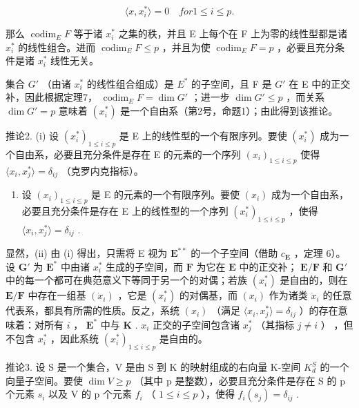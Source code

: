 \[
\langle x, x _ {i} ^ {*} \rangle = 0 \quad for 1 \leqslant i \leqslant p.
\]

那么 \(\operatorname{codim}_{E} F\) 等于诸 \(x_{i}^{*}\) 之集的秩，并且 E 上每个在 F 上为零的线性型都是诸 \(x_{i}^{*}\) 的线性组合。进而 \(\operatorname{codim}_{E} F \leqslant p\) ，并且为使 \(\operatorname{codim}_{E} F = p\) ，必要且充分条件是诸 \(x_{i}^{*}\) 线性无关。

集合 \(G'\) （由诸 \(x_{i}^{*}\) 的线性组合组成）是 \(E^{*}\) 的子空间，且 F 是 \(G'\) 在 E 中的正交补，因此根据定理7， \(\operatorname{codim}_{E} F = \dim G'\) ；进一步 \(\dim G' \leqslant p\) ，而关系 \(\dim G' = p\) 意味着 \((x_{i}^{*})\) 是一个自由系（第2号，命题1）；由此得到该推论。

推论2. (i) 设 \((x_{i}^{*})_{1\leqslant i\leqslant p}\) 是 E 上的线性型的一个有限序列。要使 \((x_{i}^{*})\) 成为一个自由系，必要且充分条件是存在 E 的元素的一个序列 \((x_{i})_{1\leqslant i\leqslant p}\) 使得 \(\langle x_i,x_j^*\rangle = \delta_{ij}\) （克罗内克指标）。

\begin{enumerate}
\def\labelenumi{(\roman{enumi})}
\setcounter{enumi}{1}
\tightlist
\item
  设 \((x_{i})_{1\leqslant i\leqslant p}\) 是 E 的元素的一个有限序列。要使 \((x_{i})\) 成为一个自由系，必要且充分条件是存在 E 上的线性型的一个序列 \((x_{i}^{*})_{1\leqslant i\leqslant p}\) ，使得 \(\langle x_i,x_j^*\rangle = \delta_{ij}\) .
\end{enumerate}

显然，(ii) 由 (i) 得出，只需将 E 视为 \(\mathbf{E}^{**}\) 的一个子空间（借助 \(c_{\mathbf{E}}\) ，定理 6）。设 \(\mathbf{G}'\) 为 \(\mathbf{E}^*\) 中由诸 \(x_{i}^{*}\) 生成的子空间，而 \(\mathbf{F}\) 为它在 \(\mathbf{E}\) 中的正交补； \(\mathbf{E} / \mathbf{F}\) 和 \(\mathbf{G}'\) 中的每一个都可在典范意义下等同于另一个的对偶；若族 \((x_{i}^{*})\) 是自由的，则在 \(\mathbf{E} / \mathbf{F}\) 中存在一组基 \((\dot{x}_i)\) ，它是 \((x_{i}^{*})\) 的对偶基，而 \((x_{i})\) 作为诸类 \(\dot{x}_{i}\) 的任意代表系，都具有所需的性质。反之，系统 \((x_{i})\) （满足 \(\langle x_{i}, x_{j}^{*} \rangle = \delta_{ij}\) ）的存在意味着：对所有 \(i\) ， \(\mathbf{E}^*\) 中与 \(\mathbf{K}\) . \(x_{i}\) 正交的子空间包含诸 \(x_{j}^{*}\) （其指标 \(j \neq i\) ） ，但不包含 \(x_{i}^{*}\) ，因此系统 \((x_{i}^{*})_{1 \leqslant i \leqslant p}\) 是自由的。

推论3. 设 S 是一个集合，V 是由 S 到 K 的映射组成的右向量 K-空间 \(K_{d}^{S}\) 的一个向量子空间。要使 \(\dim V \geqslant p\) （其中 p 是整数），必要且充分条件是存在 S 的 p 个元素 \(s_{i}\) 以及 V 的 p 个元素 \(f_{i}\) （ \(1 \leqslant i \leqslant p\) ），使得 \(f_{i}(s_{j}) = \delta_{ij}\) .

